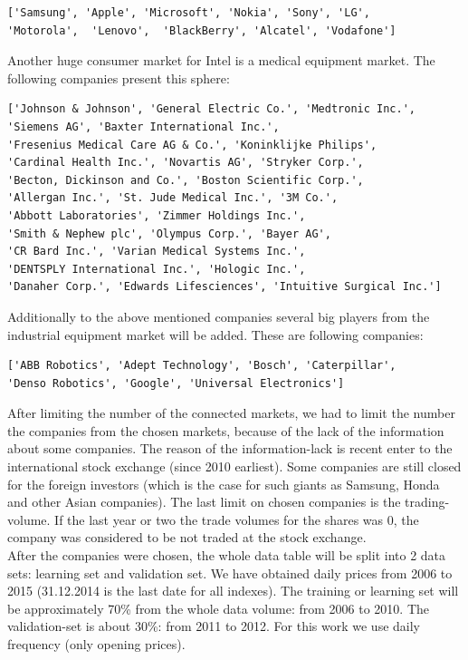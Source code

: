 \documentclass{article}
\begin{document}
\begin{verbatim}
['Samsung', 'Apple', 'Microsoft', 'Nokia', 'Sony', 'LG',
'Motorola',  'Lenovo',  'BlackBerry', 'Alcatel', 'Vodafone']
\end{verbatim} 
Another huge consumer market for Intel is a medical equipment market. The following companies present this sphere:
\begin{verbatim}
['Johnson & Johnson', 'General Electric Co.', 'Medtronic Inc.',
'Siemens AG', 'Baxter International Inc.', 
'Fresenius Medical Care AG & Co.', 'Koninklijke Philips',
'Cardinal Health Inc.', 'Novartis AG', 'Stryker Corp.',
'Becton, Dickinson and Co.', 'Boston Scientific Corp.',
'Allergan Inc.', 'St. Jude Medical Inc.', '3M Co.',
'Abbott Laboratories', 'Zimmer Holdings Inc.', 
'Smith & Nephew plc', 'Olympus Corp.', 'Bayer AG',
'CR Bard Inc.', 'Varian Medical Systems Inc.',
'DENTSPLY International Inc.', 'Hologic Inc.', 
'Danaher Corp.', 'Edwards Lifesciences', 'Intuitive Surgical Inc.']
\end{verbatim}
Additionally to the above mentioned companies several big players from the industrial equipment market will be added. These are following companies:
\begin{verbatim}
['ABB Robotics', 'Adept Technology', 'Bosch', 'Caterpillar',
'Denso Robotics', 'Google', 'Universal Electronics']
\end{verbatim}
After limiting the number of the connected markets, we had to limit the number the companies from the chosen markets, because of the lack of the information about some companies. The reason of the information-lack is recent enter to the international stock exchange (since 2010 earliest). Some companies are still closed for the foreign investors (which is the case for such giants as Samsung, Honda and other Asian companies). The last limit on chosen companies is the trading-volume. If the last year or two the trade volumes for the shares was 0, the company was considered to be not traded at the stock exchange.\\
After the companies were chosen, the whole data table will be split into 2 data sets: learning set and validation set. We have obtained daily prices from 2006 to 2015 (31.12.2014 is the last date for all indexes). The training or learning set will be approximately 70\% from the whole data volume: from 2006 to 2010. The validation-set is about 30\%: from 2011 to 2012. For this work we use daily frequency (only opening prices).\\

\newpage
\end{document}
